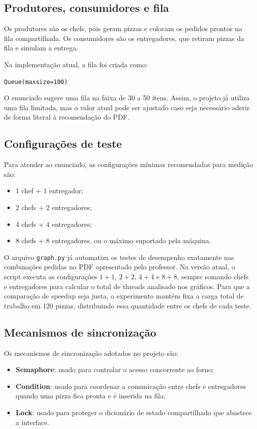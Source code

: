 \documentclass[12pt,a4paper]{article}
\begin{document}
\subsection{Produtores, consumidores e fila}
Os produtores s\~ao os chefs, pois geram pizzas e colocam os pedidos prontos na fila compartilhada. Os consumidores s\~ao os entregadores, que retiram pizzas da fila e simulam a entrega.

Na implementa\c{c}\~ao atual, a fila foi criada como:
\begin{center}
\texttt{Queue(maxsize=100)}
\end{center}
O enunciado sugere uma fila na faixa de 30 a 50 itens. Assim, o projeto j\'a utiliza uma fila limitada, mas o valor atual pode ser ajustado caso seja necess\'ario aderir de forma literal \`a recomenda\c{c}\~ao do PDF.

\subsection{Configura\c{c}\~oes de teste}
Para atender ao enunciado, as configura\c{c}\~oes m\'inimas recomendadas para medi\c{c}\~ao s\~ao:
\begin{itemize}
    \item 1 chef + 1 entregador;
    \item 2 chefs + 2 entregadores;
    \item 4 chefs + 4 entregadores;
    \item 8 chefs + 8 entregadores, ou o m\'aximo suportado pela m\'aquina.
\end{itemize}

O arquivo \texttt{graph.py} j\'a automatiza os testes de desempenho exatamente nas combina\c{c}\~oes pedidas no PDF apresentado pelo professor. Na vers\~ao atual, o script executa as configura\c{c}\~oes \(1{+}1\), \(2{+}2\), \(4{+}4\) e \(8{+}8\), sempre somando chefs e entregadores para calcular o total de threads analisado nos gr\'aficos. Para que a compara\c{c}\~ao de speedup seja justa, o experimento mant\'em fixa a carga total de trabalho em 120 pizzas, distribuindo essa quantidade entre os chefs de cada teste.

\subsection{Mecanismos de sincroniza\c{c}\~ao}
Os mecanismos de sincroniza\c{c}\~ao adotados no projeto s\~ao:
\begin{itemize}
    \item \textbf{Semaphore}: usado para controlar o acesso concorrente ao forno;
    \item \textbf{Condition}: usado para coordenar a comunica\c{c}\~ao entre chefs e entregadores quando uma pizza fica pronta e \'e inserida na fila;
    \item \textbf{Lock}: usado para proteger o dicion\'ario de estado compartilhado que abastece a interface.
\end{itemize}
\end{document}
